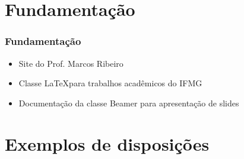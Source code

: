 \documentclass[aspectratio=169]{beamer}
\begin{document}

\section{Fundamentação}

\begin{frame}[fragile] \frametitle{Fundamentação}
\begin{itemize} \itemsep1em
 \item Site do Prof. Marcos Ribeiro \cite{marcos:site}
 \item Classe \LaTeX para trabalhos acadêmicos do IFMG \cite{marcos:iftex}
 \item Documentação da classe Beamer para apresentação de slides \cite{tantau:beamer}
\end{itemize}
\end{frame}


\section{Exemplos de disposições}
\end{document}
